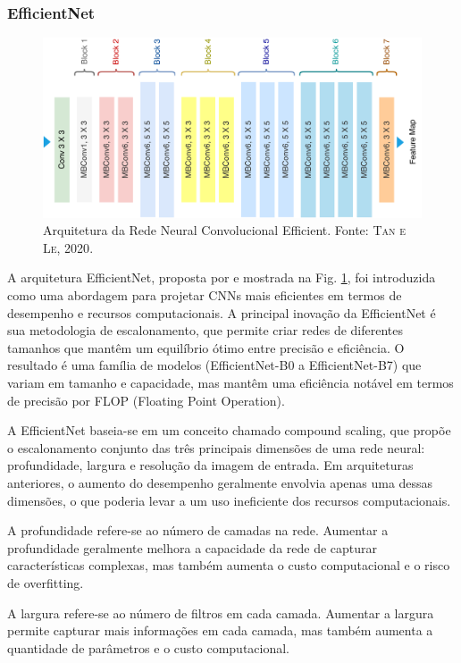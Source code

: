 \documentclass[a4,12pt]{horizon-theme}
\begin{document}
\subsubsection{EfficientNet}
\label{sec:effnet}
\begin{figure}[!ht]
  \includegraphics[width=\textwidth]{figures/EfficientNet.png}
  \caption{Arquitetura da Rede Neural Convolucional Efficient. Fonte: \textsc{Tan e Le, 2020}.}
  \label{fig:effnet}
\end{figure}
A arquitetura EfficientNet, proposta por \cite{EfficientNet} e mostrada na Fig. \ref{fig:effnet}, foi introduzida como uma abordagem para projetar CNNs mais eficientes em termos de desempenho e recursos computacionais. A principal inovação da EfficientNet é sua metodologia de escalonamento, que permite criar redes de diferentes tamanhos que mantêm um equilíbrio ótimo entre precisão e eficiência. O resultado é uma família de modelos (EfficientNet-B0 a EfficientNet-B7) que variam em tamanho e capacidade, mas mantêm uma eficiência notável em termos de precisão por FLOP (Floating Point Operation).

A EfficientNet baseia-se em um conceito chamado compound scaling, que propõe o escalonamento conjunto das três principais dimensões de uma rede neural: profundidade, largura e resolução da imagem de entrada. Em arquiteturas anteriores, o aumento do desempenho geralmente envolvia apenas uma dessas dimensões, o que poderia levar a um uso ineficiente dos recursos computacionais.

A profundidade refere-se ao número de camadas na rede. Aumentar a profundidade geralmente melhora a capacidade da rede de capturar características complexas, mas também aumenta o custo computacional e o risco de overfitting.

A largura refere-se ao número de filtros em cada camada. Aumentar a largura permite capturar mais informações em cada camada, mas também aumenta a quantidade de parâmetros e o custo computacional.
\end{document}
